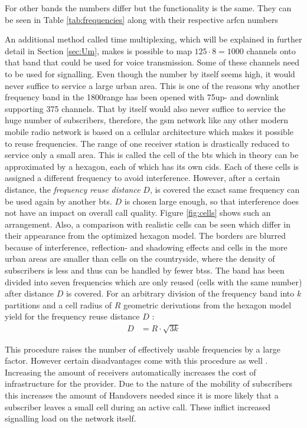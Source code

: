 For other bands the numbers differ but the functionality is the same.
They can be seen in Table \ref{tab:frequencies} along with their respective \gls{arfcn} numbers 

An additional method called time multiplexing, which will be explained in further detail in Section \ref{sec:Um}, makes is possible to map $125 \cdot 8 = 1000$ channels onto that band that could be used for voice transmission.
Some of these channels need to be used for signalling.
Even though the number by itself seems high, it would never suffice to service a large urban area.
This is one of the reasons why another frequency band in the 1800\MHz range has been opened with 75\MHz up- and downlink supporting 375 channels.
That by itself would also never suffice to service the huge number of subscribers, therefore, the \gls{gsm} network like any other modern mobile radio network is based on a cellular architecture which makes it possible to reuse frequencies.
The range of one receiver station is drastically reduced to service only a small area.
This is called the cell of the \gls{bts} which in theory can be approximated by a hexagon, each of which has its own \glspl{cid}.
Each of these cells is assigned a different frequency to avoid interference.
However, after a certain distance, the \emph{frequency reuse distance} $D$, is covered the exact same frequency can be used again by another \gls{bts}.
$D$ is chosen large enough, so that interference does not have an impact on overall call quality.
Figure \ref{fig:cells} shows such an arrangement.
Also, a comparison with realistic cells can be seen which differ in their appearance from the optimized hexagon model.
The borders are blurred because of interference, reflection- and shadowing effects and cells in the more urban areas are smaller than cells on the countryside, where the density of subscribers is less and thus can be handled by fewer \glspl{bts}.
The band has been divided into seven frequencies which are only reused (cells with the same number) after distance $D$ is covered.
For an arbitrary division of the frequency band into $k$ partitions and a cell radius of $R$ geometric derivations from the hexagon model yield for the frequency reuse distance $D$ \cite{GSM2009}:
\begin{align}
D	&=R\cdot\sqrt{3k}
\end{align}

This procedure raises the number of effectively usable frequencies by a large factor.
However certain disadvantages come with this procedure as well \cite{protocols1999}.
Increasing the amount of receivers automatically increases the cost of infrastructure for the provider.
Due to the nature of the mobility of subscribers this increases the amount of Handovers needed since it is more likely that a subscriber leaves a small cell during an active call.
These inflict increased signalling load on the network itself.

